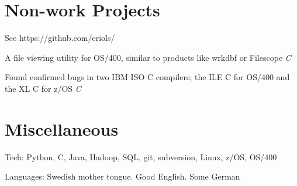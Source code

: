 \documentclass[letterpaper]{scrartcl}
\begin{document}
\section*{Non-work Projects}
\begin{list1}
\item
  \begin{list2}
  \item See https://github.com/eriols/
    \begin{list3}
    \item A file viewing utility for OS/400, similar to products like wrkdbf or Filescope \hfill \emph{C}
    \end{list3}
  \item Found confirmed bugs in two IBM ISO C compilers; the ILE C for OS/400 and the XL C for z/OS \hfill \emph{C}

  \end{list2}
\end{list1}

\section*{Miscellaneous}
\begin{list1}
\item
  \begin{list2}
    \item Tech: Python, C, Java, Hadoop, SQL, git, subversion, Linux, z/OS, OS/400
    \item Languages: Swedish mother tongue. Good English. Some German
  \end{list2}
\end{list1}
\end{document}

